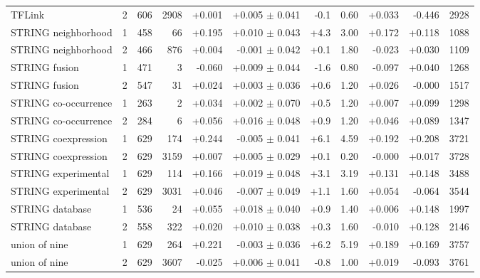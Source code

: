 \begin{table}[H]
\begin{tabular}{@{}lrrrrrrrrrr@{}}
    TFLink & 2 & 606 & 2908 & +0.001 & +0.005 $\pm$ 0.041 & -0.1 & 0.60 & +0.033 & -0.446 & 2928 \\
    STRING neighborhood & 1 & 458 & 66 & +0.195 & +0.010 $\pm$ 0.043 & +4.3 & 3.00 & +0.172 & +0.118 & 1088 \\
    STRING neighborhood & 2 & 466 & 876 & +0.004 & -0.001 $\pm$ 0.042 & +0.1 & 1.80 & -0.023 & +0.030 & 1109 \\
    STRING fusion & 1 & 471 & 3 & -0.060 & +0.009 $\pm$ 0.044 & -1.6 & 0.80 & -0.097 & +0.040 & 1268 \\
    STRING fusion & 2 & 547 & 31 & +0.024 & +0.003 $\pm$ 0.036 & +0.6 & 1.20 & +0.026 & -0.000 & 1517 \\
    STRING co-occurrence & 1 & 263 & 2 & +0.034 & +0.002 $\pm$ 0.070 & +0.5 & 1.20 & +0.007 & +0.099 & 1298 \\
    STRING co-occurrence & 2 & 284 & 6 & +0.056 & +0.016 $\pm$ 0.048 & +0.9 & 1.20 & +0.046 & +0.089 & 1347 \\
    STRING coexpression & 1 & 629 & 174 & +0.244 & -0.005 $\pm$ 0.041 & +6.1 & 4.59 & +0.192 & +0.208 & 3721 \\
    STRING coexpression & 2 & 629 & 3159 & +0.007 & +0.005 $\pm$ 0.029 & +0.1 & 0.20 & -0.000 & +0.017 & 3728 \\
    STRING experimental & 1 & 629 & 114 & +0.166 & +0.019 $\pm$ 0.048 & +3.1 & 3.19 & +0.131 & +0.148 & 3488 \\
    STRING experimental & 2 & 629 & 3031 & +0.046 & -0.007 $\pm$ 0.049 & +1.1 & 1.60 & +0.054 & -0.064 & 3544 \\
    STRING database & 1 & 536 & 24 & +0.055 & +0.018 $\pm$ 0.040 & +0.9 & 1.40 & +0.006 & +0.148 & 1997 \\
    STRING database & 2 & 558 & 322 & +0.020 & +0.010 $\pm$ 0.038 & +0.3 & 1.60 & -0.010 & +0.128 & 2146 \\
    union of nine & 1 & 629 & 264 & +0.221 & -0.003 $\pm$ 0.036 & +6.2 & 5.19 & +0.189 & +0.169 & 3757 \\
    union of nine & 2 & 629 & 3607 & -0.025 & +0.006 $\pm$ 0.041 & -0.8 & 1.00 & +0.019 & -0.093 & 3761 \\
    \hline
  \end{tabular}
\end{table}
